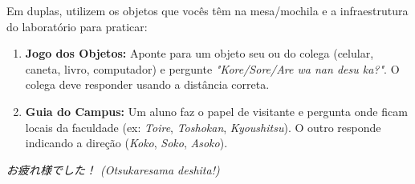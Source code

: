 \documentclass[12pt,a4paper]{article}
\begin{document}
\vspace{0.5cm}

\begin{tcolorbox}[colback=jppurple!6, colframe=jppurple, title=\textbf{Dinâmica em Grupo (Prática Presencial)}, fonttitle=\bfseries]
\small
Em duplas, utilizem os objetos que vocês têm na mesa/mochila e a infraestrutura do laboratório para praticar:
\begin{enumerate}[leftmargin=*]
    \item \textbf{Jogo dos Objetos:} Aponte para um objeto seu ou do colega (celular, caneta, livro, computador) e pergunte \textit{"Kore/Sore/Are wa nan desu ka?"}. O colega deve responder usando a distância correta.
    \item \textbf{Guia do Campus:} Um aluno faz o papel de visitante e pergunta onde ficam locais da faculdade (ex: \textit{Toire}, \textit{Toshokan}, \textit{Kyoushitsu}). O outro responde indicando a direção (\textit{Koko}, \textit{Soko}, \textit{Asoko}).
\end{enumerate}
\end{tcolorbox}

\vspace{0.4cm}

\begin{center}
    \small\color{gray} \textit{お疲れ様でした！ (Otsukaresama deshita!)}
\end{center}
\end{document}
